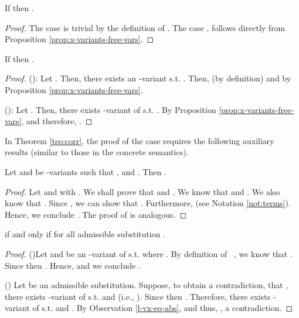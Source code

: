 \documentclass{tlp}
\begin{document}
\begin{proposition}\label{prop:exists-free-vars}
If  then .
\end{proposition}
\begin{proof}
		The case  is trivial by the definition of . 
		The case , follows directly from Proposition \ref{prop:x-variants-free-vars}.
\end{proof}

\begin{proposition} \label{prop:den-se-ext}
If  then .
\end{proposition}
\begin{proof}
\noindent (): Let . Then, there exists an -variant  s.t. . Then,  (by definition) and  by Proposition \ref{prop:x-variants-free-vars}.

\noindent (): Let .  Then, there exists  -variant of  s.t. . By Proposition \ref{prop:x-variants-free-vars}, 
 and therefore, . 
\end{proof}





In Theorem \ref{teo:corr}, the proof of the    case  requires the following auxiliary results (similar to those in the concrete semantics). 

   \begin{observation}\label{l-vx-eq-abs}
Let  and  be -variants such that ,    and . Then .
\end{observation}
\begin{proof}
Let  and  with . We shall prove that  and .  We know that  
 and . We also know that 
. Since , 
we can  show that 
.
Furthermore, 
 (see Notation \ref{not:terms}). 
Hence, we conclude 
. The proof of  is analogous. 
\end{proof}


\begin{proposition}\label{prop:forall-subs-abs}
 if and only if   for all admissible substitution . 
\end{proposition}
\begin{proof}
()Let  and   be an -variant of  s.t.  where . By definition of~ , we know that . Since  then . Hence,  and we conclude . 

\noindent() Let  be an admissible substitution. Suppose, to obtain a contradiction, that , there exists  -variant of  s.t.  and  (i.e., ). Since  then .  Therefore, there exists  -variant of  s.t.  and . By Observation \ref{l-vx-eq-abs},   and thus,  , a contradiction. 
\end{proof}

 
\end{document}
